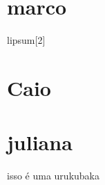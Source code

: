 
    \section{marco}
    lipsum[2]
    \section{Caio}
    \section{juliana}
    isso é uma urukubaka













